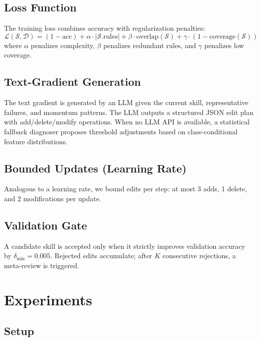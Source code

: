 \documentclass{article}
\begin{document}
\subsection{Loss Function}

The training loss combines accuracy with regularization penalties:
\begin{equation}
\mathcal{L}(\mathcal{S}, \mathcal{D}) = (1 - \text{acc}) + \alpha \cdot |\mathcal{S}.\text{rules}| + \beta \cdot \text{overlap}(\mathcal{S}) + \gamma \cdot (1 - \text{coverage}(\mathcal{S}))
\end{equation}
where $\alpha$ penalizes complexity, $\beta$ penalizes redundant rules, and $\gamma$ penalizes low coverage.

\subsection{Text-Gradient Generation}

The text gradient is generated by an LLM given the current skill, representative failures, and momentum patterns. The LLM outputs a structured JSON edit plan with add/delete/modify operations. When no LLM API is available, a statistical fallback diagnoser proposes threshold adjustments based on class-conditional feature distributions.

\subsection{Bounded Updates (Learning Rate)}

Analogous to a learning rate, we bound edits per step: at most 3 adds, 1 delete, and 2 modifications per update.

\subsection{Validation Gate}

A candidate skill is accepted only when it strictly improves validation accuracy by $\delta_{\text{min}} = 0.005$. Rejected edits accumulate; after $K$ consecutive rejections, a meta-review is triggered.

\section{Experiments}

\subsection{Setup}
\end{document}
